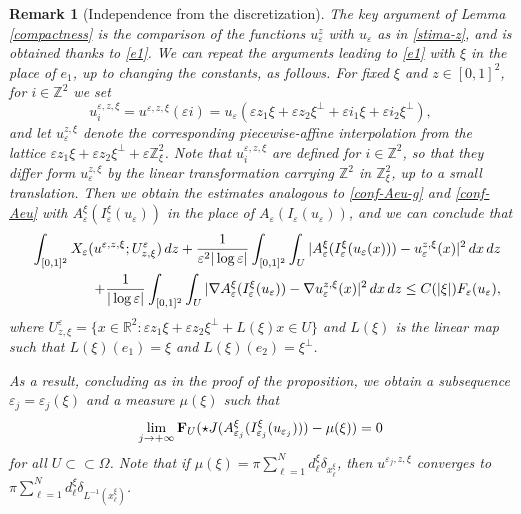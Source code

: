 \documentclass[11pt]{article}
\newtheorem{remark}[definition]{Remark}
\def\e{\varepsilon}
\begin{document}
\begin{remark}[Independence from the discretization]
The key argument of Lemma \ref{compactness}  is the comparison of the functions $u_\e^z$ with $u_\e$ as in \eqref{stima-z}, and is obtained thanks to \eqref{e1}. 
We can repeat the arguments leading to \eqref{e1} with $\xi$ in the place of $e_1$, up to changing the constants, as follows. 
For fixed $\xi$ and $z\in[0,1]^2$, for $i\in\mathbb Z^2$ we set 
\begin{equation}\label{uexiz}
u^{\e,z,\xi}_i=u^{\e,z,\xi}(\e i)=u_\e(\e z_1\xi+\e z_2\xi^\perp+\e i_1 \xi +\e i_2 \xi^\perp), 
\end{equation} 
and let $u^{z,\xi}_\e$ denote the corresponding piecewise-affine interpolation from the lattice $\e z_1\xi+\e z_2\xi^\perp+\e \mathbb Z^2_\xi$. 
Note that $u^{\e,z,\xi}_i$ are defined for $i\in\mathbb Z^2$, so that they differ form $u_\e^{z,\xi}$ by the linear transformation carrying $\mathbb Z^2$ in $\mathbb Z^2_\xi$, up to a small translation.  
Then we obtain the estimates analogous to \eqref{conf-Aeu-g} and \eqref{conf-Aeu} with $A^\xi_{\e}(I^\xi_{\e}(u_{\e}))$ in the place of $A_{\e}(I_{\e}(u_{\e}))$, and we can conclude that 
\begin{eqnarray}\nonumber&&\hskip-1.5cm\int_{[0,1]^2} X_{\e} (u^{\e,z,\xi};U^\e_{z,\xi})\,dz +\frac{1}{\e^2|\log\e|}\int_{[0,1]^2} \int_U| A^\xi_{\e}(I^\xi_{\e}(u_{\e} (x))) - u^{z,\xi}_{\e}(x)|^2\, dx\,dz\\
&&\hskip1.5cm+
 \frac{1}{|\log{\e}|}\int_{[0,1]^2} \int_U| \nabla A^\xi_{\e}(I^\xi_{\e}(u_{\e})) - \nabla u^{z,\xi}_{\e}(x)|^2\, dx\,dz\le C(|\xi|) F_\e(u_\e), 
 \end{eqnarray}
where
$U^\e_{z,\xi}=\{x\in\mathbb R^2: \e z_1 \xi+\e z_2\xi^\perp +L(\xi)x\in U\}$ 
and $L(\xi)$ is the linear map such that $L(\xi)(e_1)=\xi$ and $L(\xi)(e_2)=\xi^\perp$. 

As a result, concluding as in the proof of the proposition, we obtain 
a subsequence $\e_j=\e_j(\xi)$ and 
a measure 
$\mu(\xi)$ such that 
\begin{equation}\label{defxi}\lim_{j\to+\infty}{\bf F}_U(\star J(A^\xi_{\e_j}(I_{\e_j}^\xi(u_{\e_j})))-\mu(\xi))=0\end{equation} 
for all $U\subset\subset\Omega$. 
Note that if $\mu(\xi)=\pi\sum_{\ell=1}^Nd^\xi_\ell\delta_{x^\xi_\ell}$, then $u^{\e_j,z,\xi}$ converges to 
$\pi\sum_{\ell=1}^Nd^\xi_\ell\delta_{L^{-1}(x^\xi_\ell)}$. 


\end{remark}
\end{document}
